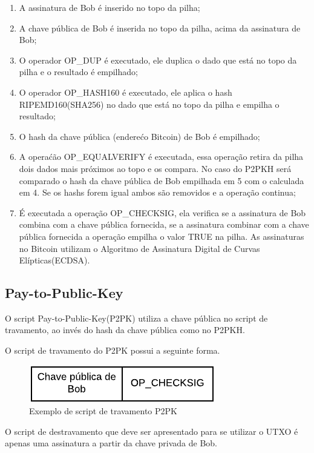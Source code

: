\documentclass[conference,compsoc]{IEEEtran}
\begin{document}
\begin{enumerate}
\item A assinatura de Bob é inserido no topo da pilha;
\item A chave pública de Bob é inserida no topo da pilha, acima da assinatura de Bob;
\item O operador OP\_DUP é executado, ele duplica o dado que está no topo da pilha e o resultado é empilhado;
\item O operador OP\_HASH160 é executado, ele aplica o hash RIPEMD160(SHA256) no dado que está no topo da pilha e empilha o resultado;
\item O hash da chave pública (enderećo Bitcoin) de Bob é empilhado;
\item A operaćão OP\_EQUALVERIFY é executada, essa operação retira da pilha dois dados mais próximos ao topo e os compara. No caso do P2PKH será comparado o hash da chave pública de Bob empilhada em 5 com o calculada em 4. Se os hashs forem igual ambos são removidos e a operação continua;
\item É executada a operação OP\_CHECKSIG, ela verifica se a assinatura de Bob combina com a chave pública fornecida, se a assinatura combinar com a chave pública fornecida a operação empilha o valor TRUE na pilha. As assinaturas no Bitcoin utilizam o Algoritmo de Assinatura Digital de Curvas Elípticas(ECDSA).
\end{enumerate}

\subsection*{Pay-to-Public-Key}
O script Pay-to-Public-Key(P2PK) utiliza a chave pública no script de travamento, ao invés do hash da chave pública como no P2PKH. 

O script de travamento do P2PK possui a seguinte forma.
 
\begin{figure}[H]
    \centering
    \includegraphics[keepaspectratio=true, scale=0.8]{img/P2PK_script_travamento.pdf}
    \caption{Exemplo de script de travamento P2PK}
    \label{fig:P2PK_Travamento}
\end{figure}


O script de destravamento que deve ser apresentado para se utilizar o UTXO é apenas uma assinatura a partir da chave privada de Bob.
\end{document}
